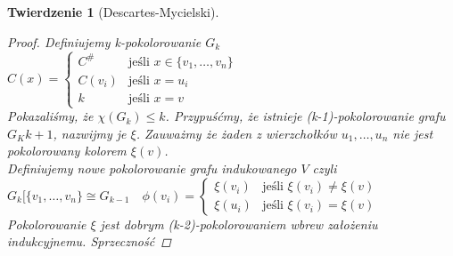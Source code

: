 \documentclass[12pt,a4paper]{article}
\newtheorem{tw}{Twierdzenie}
\theoremstyle{definition}
\begin{document}
\begin{tw}[Descartes-Mycielski]
\begin{proof}
Definiujemy k-pokolorowanie $G_k$\\
$C(x) = \left\{\begin{matrix}
C^\# & \text{jeśli } x\in\{v_1,\dots,v_n\}\\
C(v_i) & \text{jeśli } x=u_i\\
k & \text{jeśli } x=v
\end{matrix}\right.$\\
Pokazaliśmy, że $\chi(G_k) \leqslant k$. Przypuśćmy, że istnieje (k-1)-pokolorowanie grafu $G_K{k+1}$, nazwijmy je $\xi$. Zauważmy że żaden z wierzchołków $u_1,\dots,u_n$ nie jest pokolorowany kolorem $\xi(v)$.\\
Definiujemy nowe pokolorowanie grafu indukowanego $V$ czyli $G_k[\{v_1,\dots,v_n\} \cong G_{k-1}\quad \phi(v_i) = 
\left\{\begin{matrix}
	\xi(v_i) & \text{jeśli } \xi(v_i) \neq \xi(v)\\
	\xi(u_i) & \text{jeśli } \xi(v_i) = \xi(v)
\end{matrix}\right.$
Pokolorowanie $\xi$ jest dobrym (k-2)-pokolorowaniem wbrew założeniu indukcyjnemu. Sprzeczność
\end{proof}
\end{tw}

\end{document}
